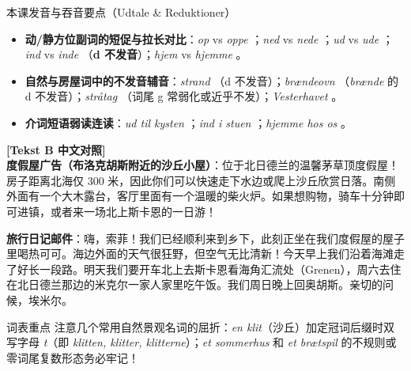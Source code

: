 \begin{tipbox}{本课发音与吞音要点（Udtale \& Reduktioner）}
\begin{itemize}
  \item \textbf{动/静方位副词的短促与拉长对比}：\textit{op}  vs \textit{oppe} ；\textit{ned}  vs \textit{nede} ；\textit{ud}  vs \textit{ude} ；\textit{ind}  vs \textit{inde} （\textbf{d 不发音}）；\textit{hjem}  vs \textit{hjemme} 。
  \item \textbf{自然与房屋词中的不发音辅音}：\textit{strand} （d 不发音）；\textit{brændeovn} （\textit{brænde} 的 d 不发音）；\textit{stråtag} （词尾 g 常弱化或近乎不发）；\textit{Vesterhavet} 。
  \item \textbf{介词短语弱读连读}：\textit{ud til kysten} ；\textit{ind i stuen} ；\textit{hjemme hos os} 。
\end{itemize}
\end{tipbox}

\begin{transbox}
\small
\textbf{\color{NCDTeal}[Tekst B 中文对照]}\\
\textbf{度假屋广告（布洛克胡斯附近的沙丘小屋）}：位于北日德兰的温馨茅草顶度假屋！房子距离北海仅 300 米，因此你们可以快速走下水边或爬上沙丘欣赏日落。南侧外面有一个大木露台，客厅里面有一个温暖的柴火炉。如果想购物，骑车十分钟即可进镇，或者来一场北上斯卡恩的一日游！

\textbf{旅行日记邮件}：嗨，索菲！我们已经顺利来到乡下，此刻正坐在我们度假屋的屋子里喝热可可。海边外面的天气很狂野，但空气无比清新！今天早上我们沿着海滩走了好长一段路。明天我们要开车北上去斯卡恩看海角汇流处（Grenen），周六去住在北日德兰那边的米克尔一家人家里吃午饭。我们周日晚上回奥胡斯。亲切的问候，埃米尔。
\end{transbox}


\begin{tipbox}{词表重点}
注意几个常用自然景观名词的屈折：\textit{en klit}（沙丘）加定冠词后缀时双写字母 \textit{t}（即 \textit{klitten, klitter, klitterne}）；\textit{et sommerhus} 和 \textit{et brætspil} 的不规则或零词尾复数形态务必牢记！
\end{tipbox}


